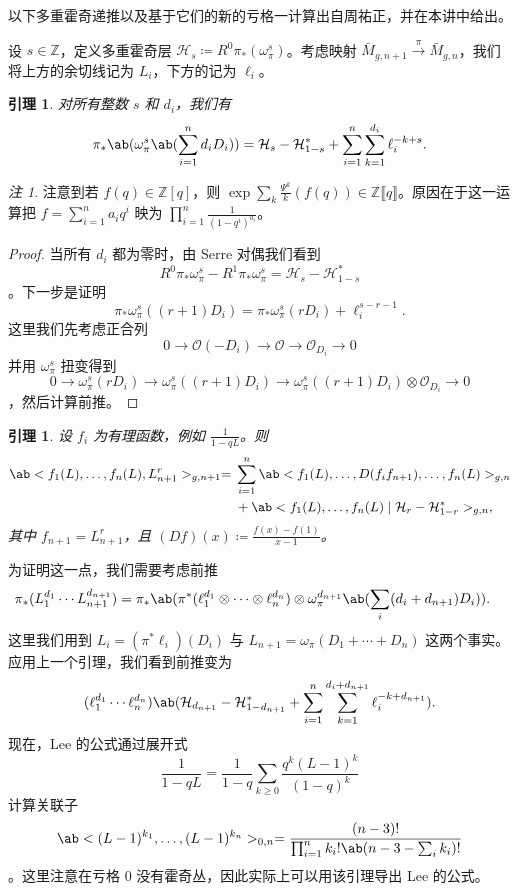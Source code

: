 \documentclass{amsart}
\newtheorem{lem}[thm]{引理}
\theoremstyle{definition}
\theoremstyle{remark}
\newtheorem{rmk}[thm]{注}
\theoremstyle{plain}
\theoremstyle{definition}
\theoremstyle{remark}
\newcommand{\Z}{\mathbb{Z}}
\newcommand{\mc}[1]{\mathcal{#1}}
\newcommand{\1}{\mathbf{1}}
\newcommand{\2}{\mathbf{2}}
\newcommand{\3}{\mathbf{3}}
\newcommand{\ps}[1]{\llbracket #1 \rrbracket}
\begin{document}
以下多重霍奇递推以及基于它们的新的亏格一计算出自周祐正，并在本讲中给出。

设 \(s \in \Z\)，定义多重霍奇层 \(\mc{H}_s \coloneqq R^0 \pi_* (\omega_{\pi}^s)\)。考虑映射 \(\bar{M}_{g,n+1} \xrightarrow{\pi} \bar{M}_{g,n}\)，我们将上方的余切线记为 \(L_i\)，下方的记为 \(\ell_i\)。

\begin{lem}
    对所有整数 \(s\) 和 \(d_i\)，我们有
    \[ \pi_*\ab(\omega_{\pi}^s\ab(\sum_{i=1}^n d_i D_i)) = \mc{H}_s-\mc{H}_{1-s}^* + \sum_{i=1}^n \sum_{k=1}^{d_i} \ell_i^{-k+s}. \]
\end{lem}

\begin{rmk}
    注意到若 \(f(q) \in \Z[q]\)，则 \(\exp \sum_k \frac{\Psi^k}{k} (f(q)) \in \Z \ps{q}\)。原因在于这一运算把 \(f = \sum_{i=1}^{n} a_i q^i\) 映为 \(\prod_{i=1}^n \frac{1}{(1-q^i)^{a_i}}\)。
\end{rmk}

\begin{proof}
    当所有 \(d_i\) 都为零时，由 Serre 对偶我们看到
    \[ R^0 \pi_* \omega_{\pi}^s - R^1 \pi_* \omega_{\pi}^s = \mc{H}_s - \mc{H}_{1-s}^* \]
    。下一步是证明
    \[ \pi_* \omega_{\pi}^s ((r+1)D_i) = \pi_* \omega_{\pi}^s(r D_i) + \ell_i^{s-r-1}. \]
    这里我们先考虑正合列
    \[ 0 \to \mc{O} (-D_i) \to \mc{O} \to \mc{O}_{D_i} \to 0 \]
    并用 \(\omega_{\pi}^s\) 扭变得到
    \[ 0 \to \omega_{\pi}^s(r D_i) \to \omega_{\pi}^s ((r+1)D_i) \to \omega_{\pi}^s ((r+1)D_i) \otimes \mc{O}_{D_i} \to 0 \]
    ，然后计算前推。
\end{proof}

\begin{lem}
    设 \(f_i\) 为有理函数，例如 \(\frac{1}{1-q L}\)。则
    \begin{align*}
        \ab<f_1(L), \ldots, f_n(L), L_{n+1}^r>_{g, n+1} ={}& \sum_{i=1}^n \ab<f_1(L), \ldots, D(f_i f_{n+1}), \ldots, f_n(L)>_{g, n} \\
        &+ \ab<f_1(L), \ldots, f_n(L) \mid \mc{H}_r - \mc{H}_{1-r}^*>_{g,n},
    \end{align*}
    其中 \(f_{n+1} = L_{n+1}^r\)，且 \((Df)(x) \coloneqq \frac{f(x)-f(1)}{x-1}\)。
\end{lem}

为证明这一点，我们需要考虑前推
\begin{align*}
    \pi_* (L_1^{d_1} \cdots L_{n+1}^{d_{n+1}}) &= \pi_* \ab(\pi^*(\ell_1^{d_1} \otimes \cdots \otimes \ell_n^{d_n}) \otimes \omega_{\pi}^{d_{n+1}}\ab(\sum_i (d_i+d_{n+1})D_i)).
\end{align*}
这里我们用到 \(L_i = (\pi^* \ell_i)(D_i)\) 与 \(L_{n+1} = \omega_{\pi}(D_1 + \cdots + D_n)\) 这两个事实。应用上一个引理，我们看到前推变为
\[ (\ell_1^{d_1} \cdots \ell_n^{d_n})\ab(\mc{H}_{d_{n+1}} - \mc{H}_{1-d_{n+1}}^* + \sum_{i=1}^n \sum_{k=1}^{d_i + d_{n+1}} \ell_i^{-k+d_{n+1}}). \]
现在，Lee 的公式通过展开式
\[ \frac{1}{1-qL} = \frac{1}{1-q} \sum_{k \geq 0} \frac{q^k(L-1)^k}{(1-q)^k} \]
计算关联子
\[ \ab<(L-1)^{k_1}, \ldots, (L-1)^{k_n}>_{0,n} = \frac{(n-3)!}{\prod_{i=1}^n k_i! \ab(n-3-\sum_i k_i)!} \]
。这里注意在亏格 \(0\) 没有霍奇丛，因此实际上可以用该引理导出 Lee 的公式。
\end{document}
